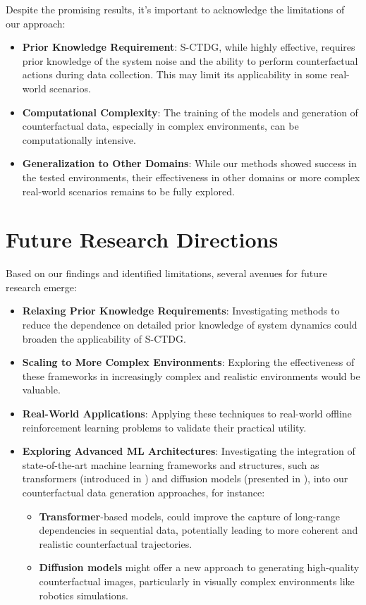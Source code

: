 Despite the promising results, it's important to acknowledge the
limitations of our approach:
\begin{itemize}
    \item \textbf{Prior Knowledge Requirement}: S-CTDG, while
    highly effective, requires prior knowledge of the system
    noise and the ability to perform counterfactual actions
    during data collection. This may limit its applicability
    in some real-world scenarios.
    \item \textbf{Computational Complexity}: The training of the models and
    generation of
    counterfactual data, especially in complex environments,
    can be computationally intensive.
    \item \textbf{Generalization to Other Domains}: While our
    methods showed success in the tested environments, their
    effectiveness in other domains or more complex real-world
    scenarios remains to be fully explored.
\end{itemize}

\section{Future Research Directions}

Based on our findings and identified limitations,
several avenues for future research emerge:
\begin{itemize}
    \item \textbf{Relaxing Prior Knowledge Requirements}: Investigating
    methods to reduce the dependence on detailed prior knowledge of
    system dynamics could broaden the applicability of S-CTDG.
    \item \textbf{Scaling to More Complex Environments}: Exploring
    the effectiveness of these frameworks in increasingly complex
    and realistic environments would be valuable.
    \item \textbf{Real-World Applications}: Applying these
    techniques to real-world offline reinforcement learning problems
    to validate their practical utility.
    \item \textbf{Exploring Advanced ML Architectures}:
    Investigating the integration of state-of-the-art machine
    learning frameworks and structures, such as transformers
    (introduced in \cite{vaswani2023attentionneed})
    and diffusion models
    (presented in \cite{sohldickstein2015deepunsupervisedlearningusing}),
    into our counterfactual data generation approaches,
    for instance:
    \begin{itemize}
        \item \textbf{Transformer}-based models, could improve the
        capture of long-range dependencies in sequential data,
        potentially leading to more coherent and realistic
        counterfactual trajectories.
        \item \textbf{Diffusion models} might offer a new approach
        to generating high-quality counterfactual images, particularly
        in visually complex environments like robotics simulations.
    \end{itemize}
\end{itemize}

